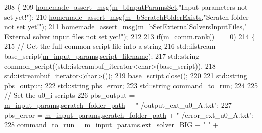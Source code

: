 \begin{DoxyCode}
208 \{
209     \hyperlink{common__header_8h_a593ccc80b790b2268653fcf6597bf451}{homemade\_assert\_msg}(\hyperlink{classcarl_1_1_solver___files___setup_a7187af3c4a90be2d8ad2a25c11c0e910}{m\_bInputParamsSet},\textcolor{stringliteral}{"Input parameters not set
       yet!"});
210     \hyperlink{common__header_8h_a593ccc80b790b2268653fcf6597bf451}{homemade\_assert\_msg}(\hyperlink{classcarl_1_1_solver___files___setup_ac59627eab870e65887560595d0fbc025}{m\_bScratchFolderExists},\textcolor{stringliteral}{"Scratch folder not
       set yet!"});
211     \hyperlink{common__header_8h_a593ccc80b790b2268653fcf6597bf451}{homemade\_assert\_msg}(\hyperlink{classcarl_1_1_solver___files___setup_ae9334ddcfaace89ab70ea918190cfd08}{m\_bSetExternalSolversInputFiles},\textcolor{stringliteral}{"
      External solver input files not set yet!"});
212 
213     \textcolor{keywordflow}{if}(\hyperlink{classcarl_1_1_solver___files___setup_aa8049195d5e383a0ca4295795e3f5751}{m\_comm}.rank() == 0)
214     \{
215         \textcolor{comment}{// Get the full common script file into a string}
216         std::ifstream base\_script(\hyperlink{classcarl_1_1_solver___files___setup_aa5804bf6c6e506b382766333f232d3d5}{m\_input\_params}.\hyperlink{structcarl_1_1feti__setup__init__params_a7e27a98f8d0d0d5b6381ba9fd40f777b}{script\_filename});
217         std::string common\_script((std::istreambuf\_iterator<char>(base\_script)),
218                                     std::istreambuf\_iterator<char>());
219         base\_script.close();
220 
221         std::string pbs\_output;
222         std::string pbs\_error;
223         std::string command\_to\_run;
224 
225         \textcolor{comment}{// Set the u0\_i scripts}
226         pbs\_output = \hyperlink{classcarl_1_1_solver___files___setup_aa5804bf6c6e506b382766333f232d3d5}{m\_input\_params}.\hyperlink{structcarl_1_1feti__setup__init__params_a57e553748427905076bae85d239f9537}{scratch\_folder\_path} + \textcolor{stringliteral}{"
      /output\_ext\_u0\_A.txt"};
227         pbs\_error  = \hyperlink{classcarl_1_1_solver___files___setup_aa5804bf6c6e506b382766333f232d3d5}{m\_input\_params}.\hyperlink{structcarl_1_1feti__setup__init__params_a57e553748427905076bae85d239f9537}{scratch\_folder\_path} + \textcolor{stringliteral}{"
      /error\_ext\_u0\_A.txt"};
228         command\_to\_run = \hyperlink{classcarl_1_1_solver___files___setup_aa5804bf6c6e506b382766333f232d3d5}{m\_input\_params}.\hyperlink{structcarl_1_1feti__setup__init__params_a90db585fd2b345de1b58f60986785195}{ext\_solver\_BIG} + \textcolor{stringliteral}{" "} + 

\end{DoxyCode}
